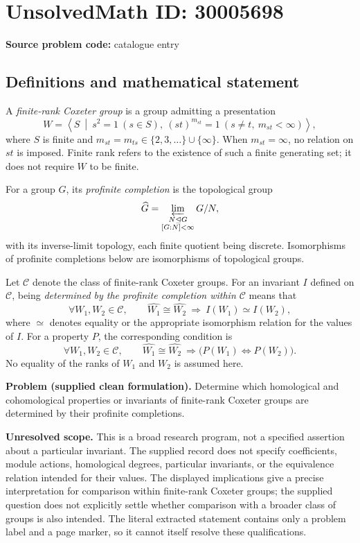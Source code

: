 \documentclass[11pt]{article}
\begin{document}
\section*{UnsolvedMath ID: 30005698}
\textbf{Source problem code:} catalogue entry
\subsection{Definitions and mathematical statement}
A \emph{finite-rank Coxeter group} is a group admitting a presentation
\[
W=\left\langle S\ \middle|\ s^2=1\ (s\in S),\ (st)^{m_{st}}=1\ (s\ne t,\ m_{st}<\infty)\right\rangle,
\]
where \(S\) is finite and \(m_{st}=m_{ts}\in\{2,3,\ldots\}\cup\{\infty\}\). When \(m_{st}=\infty\), no relation on \(st\) is imposed. Finite rank refers to the existence of such a finite generating set; it does not require \(W\) to be finite.

For a group \(G\), its \emph{profinite completion} is the topological group
\[
\widehat G=\varprojlim_{\substack{N\trianglelefteq G\\ [G:N]<\infty}}G/N,
\]
with its inverse-limit topology, each finite quotient being discrete. Isomorphisms of profinite completions below are isomorphisms of topological groups.

Let \(\mathcal C\) denote the class of finite-rank Coxeter groups. For an invariant \(I\) defined on \(\mathcal C\), being \emph{determined by the profinite completion within \(\mathcal C\)} means that
\[
\forall W_1,W_2\in\mathcal C,\qquad
\widehat{W_1}\cong\widehat{W_2}
\ \Longrightarrow\ I(W_1)\simeq I(W_2),
\]
where \(\simeq\) denotes equality or the appropriate isomorphism relation for the values of \(I\). For a property \(P\), the corresponding condition is
\[
\forall W_1,W_2\in\mathcal C,\qquad
\widehat{W_1}\cong\widehat{W_2}
\ \Longrightarrow\bigl(P(W_1)\Longleftrightarrow P(W_2)\bigr).
\]
No equality of the ranks of \(W_1\) and \(W_2\) is assumed here.

\textbf{Problem (supplied clean formulation).} Determine which homological and cohomological properties or invariants of finite-rank Coxeter groups are determined by their profinite completions.

\textbf{Unresolved scope.} This is a broad research program, not a specified assertion about a particular invariant. The supplied record does not specify coefficients, module actions, homological degrees, particular invariants, or the equivalence relation intended for their values. The displayed implications give a precise interpretation for comparison within finite-rank Coxeter groups; the supplied question does not explicitly settle whether comparison with a broader class of groups is also intended. The literal extracted statement contains only a problem label and a page marker, so it cannot itself resolve these qualifications.
\end{document}
